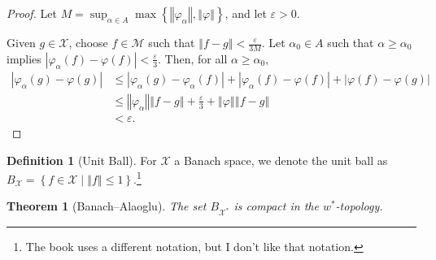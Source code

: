\documentclass[10pt]{extarticle}
\newcommand{\norm}[1]{\left\Vert #1\right\Vert}
\newcommand{\set}[1]{\left\{#1\right\}}
\newcommand{\ve}{\varepsilon}
\theoremstyle{plain}
\newtheorem*{theorem}{Theorem}
\theoremstyle{definition}
\newtheorem*{definition}{Definition}
\theoremstyle{note}
\renewcommand{\newline}{\hfill\break}
\begin{document}
\begin{proof}
  Let $\displaystyle M = \sup_{\alpha \in A}\max\set{\norm{\varphi_{\alpha}},\norm{\varphi}}$, and let $\ve > 0$.\newline

  Given $g\in \mathcal{X}$, choose $f\in \mathcal{M}$ such that $\norm{f - g} < \frac{\ve}{3M}$. Let $\alpha_0\in A$ such that $\alpha \geq \alpha_0$  implies $\left\vert \varphi_{\alpha}(f) - \varphi(f) \right\vert < \frac{\ve}{3}$. Then, for all $\alpha \geq \alpha_0$,
  \begin{align*}
    \left\vert \varphi_{\alpha}(g) - \varphi(g) \right\vert &\leq \left\vert \varphi_{\alpha}(g) - \varphi_{\alpha}(f) \right\vert + \left\vert \varphi_{\alpha}(f) - \varphi(f) \right\vert + \left\vert \varphi(f) - \varphi(g) \right\vert\\
                                                            &\leq \norm{\varphi_{\alpha}}\norm{f-g} + \frac{\ve}{3} + \norm{\varphi}\norm{f-g}\\
                                                            &< \ve.
  \end{align*}
\end{proof}
\begin{definition}[Unit Ball]
  For $\mathcal{X}$ a Banach space, we denote the unit ball as $B_{\mathcal{X}} = \set{ f\in \mathcal{X}\mid \norm{f}\leq 1}$.\footnote{The book uses a different notation, but I don't like that notation.}
\end{definition}
\begin{theorem}[Banach--Alaoglu]
  The set $B_{\mathcal{X}^{\ast}}$ is compact in the $w^{\ast}$-topology.
\end{theorem}
\end{document}
